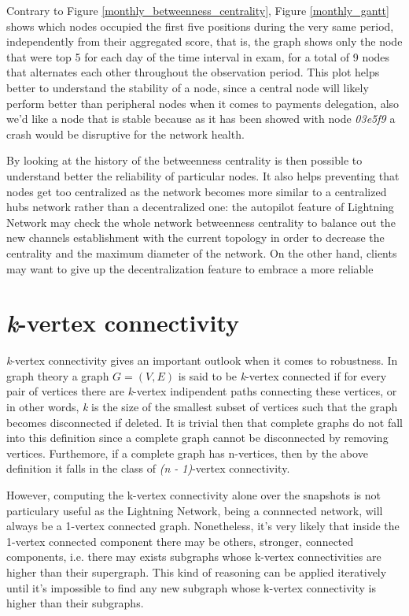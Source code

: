 	Contrary to Figure \ref{monthly_betweenness_centrality}, Figure \ref{monthly_gantt} shows which nodes occupied the first five positions during the very same period, independently from their aggregated score, that is, the graph shows only the node that were top 5 for each day of the time interval in exam, for a total of 9 nodes that alternates each other throughout the observation period. This plot helps better to understand the stability of a node, since a central node will likely perform better than peripheral nodes when it comes to payments delegation, also we'd like a node that is stable because as it has been showed with node \textit{03e5f9} a crash would be disruptive for the network health.
	
	By looking at the history of the betweenness centrality is then possible to understand better the reliability of particular nodes. It also helps preventing that nodes get too centralized as the network becomes more similar to a centralized hubs network rather than a decentralized one: the autopilot feature of Lightning Network may check the whole network betweenness centrality to balance out the new channels establishment with the current topology in order to decrease the centrality and the maximum diameter of the network. On the other hand, clients may want to give up the decentralization feature to embrace a more reliable 
	
	\newpage
	
	\section{\textit{k}-vertex connectivity}
	
	\textit{k}-vertex connectivity gives an important outlook when it comes to robustness. In graph theory a graph $G = (V,E)$ is said to be \textit{k}-vertex connected if for every pair of vertices there are \textit{k}-vertex indipendent paths connecting these vertices, or in other words, \textit{k} is the size of the smallest subset of vertices such that the graph becomes disconnected if deleted. It is trivial then that complete graphs do not fall into this definition since a complete graph cannot be disconnected by removing vertices. Furthemore, if a complete graph has n-vertices, then by the above definition it falls in the class of \textit{(n - 1)}-vertex connectivity.
	
	However, computing the k-vertex connectivity alone over the snapshots is not particulary useful as the Lightning Network, being a connnected network, will always be a 1-vertex connected graph. Nonetheless, it's very likely that inside the 1-vertex connected component there may be others, stronger, connected components, i.e. there may exists subgraphs whose k-vertex connectivities are higher than their supergraph. This kind of reasoning can be applied iteratively until it's impossible to find any new subgraph whose k-vertex connectivity is higher than their subgraphs.
	
